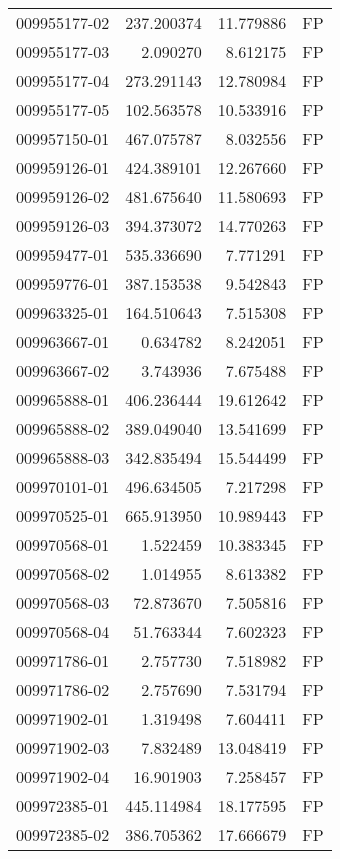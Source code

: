 \begin{tabular}{lrrl}
009955177-02 &  237.200374 &    11.779886 &   FP \\
009955177-03 &    2.090270 &     8.612175 &   FP \\
009955177-04 &  273.291143 &    12.780984 &   FP \\
009955177-05 &  102.563578 &    10.533916 &   FP \\
009957150-01 &  467.075787 &     8.032556 &   FP \\
009959126-01 &  424.389101 &    12.267660 &   FP \\
009959126-02 &  481.675640 &    11.580693 &   FP \\
009959126-03 &  394.373072 &    14.770263 &   FP \\
009959477-01 &  535.336690 &     7.771291 &   FP \\
009959776-01 &  387.153538 &     9.542843 &   FP \\
009963325-01 &  164.510643 &     7.515308 &   FP \\
009963667-01 &    0.634782 &     8.242051 &   FP \\
009963667-02 &    3.743936 &     7.675488 &   FP \\
009965888-01 &  406.236444 &    19.612642 &   FP \\
009965888-02 &  389.049040 &    13.541699 &   FP \\
009965888-03 &  342.835494 &    15.544499 &   FP \\
009970101-01 &  496.634505 &     7.217298 &   FP \\
009970525-01 &  665.913950 &    10.989443 &   FP \\
009970568-01 &    1.522459 &    10.383345 &   FP \\
009970568-02 &    1.014955 &     8.613382 &   FP \\
009970568-03 &   72.873670 &     7.505816 &   FP \\
009970568-04 &   51.763344 &     7.602323 &   FP \\
009971786-01 &    2.757730 &     7.518982 &   FP \\
009971786-02 &    2.757690 &     7.531794 &   FP \\
009971902-01 &    1.319498 &     7.604411 &   FP \\
009971902-03 &    7.832489 &    13.048419 &   FP \\
009971902-04 &   16.901903 &     7.258457 &   FP \\
009972385-01 &  445.114984 &    18.177595 &   FP \\
009972385-02 &  386.705362 &    17.666679 &   FP \\

\end{tabular}
